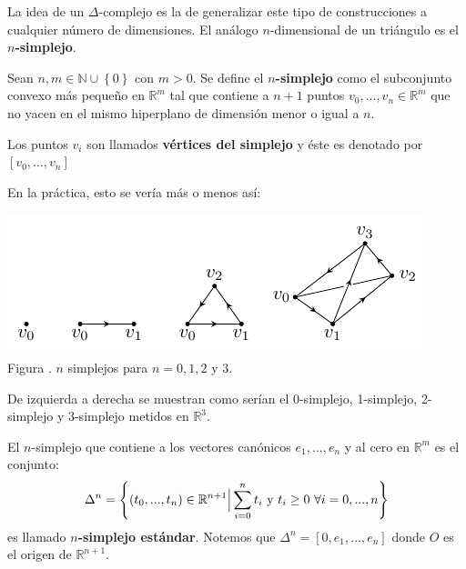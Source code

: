 \documentclass[12pt]{report}
\theoremstyle{largebreak}
\newcounter{figcount}
\begin{document}
    La idea de un $\Delta$-complejo es la de generalizar este tipo de construcciones a cualquier número de dimensiones. El análogo $n$-dimensional de un triángulo es el \textbf{$n$-simplejo}.

    \begin{mydef}
        Sean $n,m\in\mathbb{N}\cup\left\{0 \right\}$ con $m>0$. Se define el \textbf{$n$-simplejo} como el subconjunto convexo más pequeño en $\mathbb{R}^m$ tal que contiene a $n+1$ puntos $v_0,...,v_n\in\mathbb{R}^m$ que no yacen en el mismo hiperplano de dimensión menor o igual a $n$.

        Los puntos $v_i$ son llamados \textbf{vértices del simplejo} y éste es denotado por $[v_0,...,v_n]$
    \end{mydef}

    \begin{obs}
        En la práctica, esto se vería más o menos así:
        
        \begin{minipage}{\textwidth}
            \begin{center}
                \includegraphics[scale=1.5]{images/fig_1.pdf}\\
                Figura \thefigcount. $n$ simplejos para $n=0,1,2$ y $3$.
            \end{center}
        \end{minipage}

        De izquierda a derecha se muestran como serían el 0-simplejo, 1-simplejo, 2-simplejo y 3-simplejo metidos en $\mathbb{R}^3$.
    \end{obs}

    \begin{exa}
        El $n$-simplejo que contiene a los vectores canónicos $e_1,...,e_n$ y al cero en $\mathbb{R}^m$ es el conjunto:
        \begin{equation*}
            \Delta^n=\left\{(t_0,...,t_n)\in\mathbb{R}^{ n+1}\Big|\sum_{ i=0}^n t_i\textup{ y }t_i\geq0\textup{ }\forall i=0,...,n \right\}
        \end{equation*}
        es llamado \textbf{$n$-simplejo estándar}. Notemos que $\Delta^n=[0,e_1,...,e_n]$ donde $O$ es el origen de $\mathbb{R}^{ n+1}$.
    \end{exa}
\end{document}
